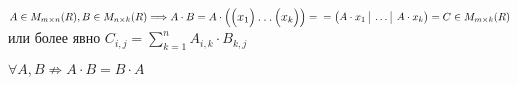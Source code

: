 \begin{definition}
    $A \in M_{m \times n}(R), B \in M_{n \times k}(R) \Longrightarrow A \cdot B = A \cdot 
    \large
    \begin{pmatrix}
        \begin{pmatrix}
            x_1
        \end{pmatrix}
        \dots
        \begin{pmatrix}
            x_k
        \end{pmatrix}
    \end{pmatrix} = \\\\
    \normalsize = 
    \begin{pmatrix}
        A \cdot x_1 \,\, \vrule \,\, \dots \,\, \vrule \,\, A \cdot x_k 
    \end{pmatrix} = C \in M_{m \times k}(R)
    $ или более явно $C_{i, j} = \sum\limits_{k = 1}^n A_{i,k} \cdot B_{k,j}$
\end{definition}

\quad
\begin{remark}
    $\forall A, B \not \Rightarrow A \cdot B = B \cdot A$\\
\end{remark}


